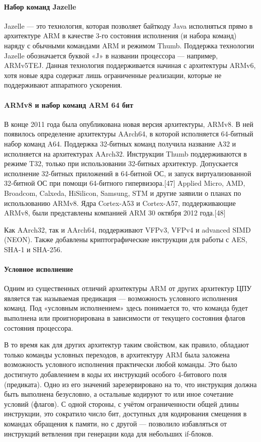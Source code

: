 \paragraph{Набор команд Jazelle}

Jazelle — это технология, которая позволяет байткоду Java исполняться прямо 
в архитектуре ARM в качестве 3-го состояния исполнения (и набора команд) 
наряду с обычными командами ARM и режимом Thumb. Поддержка технологии Jazelle 
обозначается буквой «J» в названии процессора — например, ARMv5TEJ. Данная 
технология поддерживается начиная с архитектуры ARMv6, хотя новые ядра 
содержат лишь ограниченные реализации, которые не поддерживают аппаратного 
ускорения.

\paragraph{ARMv8 и набор команд ARM 64 бит}

В конце 2011 года была опубликована новая версия архитектуры, ARMv8. В ней 
появилось определение архитектуры AArch64, в которой исполняется 64-битный 
набор команд A64. Поддержка 32-битных команд получила название A32 и
 исполняется на архитектурах AArch32. Инструкции Thumb поддерживаются в 
 режиме T32, только при использовании 32-битных архитектур. Допускается 
 исполнение 32-битных приложений в 64-битной ОС, и запуск виртуализованной 
 32-битной ОС при помощи 64-битного гипервизора.[47] Applied Micro, AMD, 
 Broadcom, Calxeda, HiSilicon, Samsung, STM и другие заявили о планах по 
 использованию ARMv8. Ядра Cortex-A53 и Cortex-A57, поддерживающие ARMv8, 
 были представлены компанией ARM 30 октября 2012 года.[48]

Как AArch32, так и AArch64, поддерживают VFPv3, VFPv4 и advanced SIMD (NEON). 
Также добавлены криптографические инструкции для работы с AES, SHA-1 и SHA-256.

\paragraph{Условное исполнение}

Одним из существенных отличий архитектуры ARM от других архитектур ЦПУ 
является так называемая предикация — возможность условного исполнения команд. 
Под «условным исполнением» здесь понимается то, что команда будет выполнена 
или проигнорирована в зависимости от текущего состояния флагов состояния 
процессора.

В то время как для других архитектур таким свойством, как правило, обладают 
только команды условных переходов, в архитектуру ARM была заложена 
возможность условного исполнения практически любой команды. Это было 
достигнуто добавлением в коды их инструкций особого 4-битового поля 
(предиката). Одно из его значений зарезервировано на то, что инструкция 
должна быть выполнена безусловно, а остальные кодируют то или иное сочетание 
условий (флагов). С одной стороны, с учётом ограниченности общей длины 
инструкции, это сократило число бит, доступных для кодирования смещения в 
командах обращения к памяти, но с другой — позволило избавляться от 
инструкций ветвления при генерации кода для небольших if-блоков.

